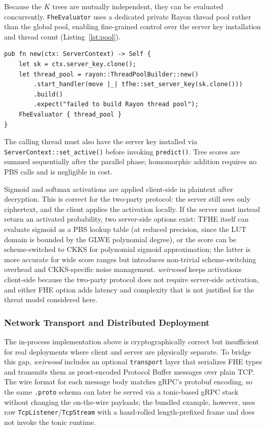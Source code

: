 \documentclass[12pt]{article}
\begin{document}
Because the $K$ trees are mutually independent, they can be evaluated concurrently. \texttt{FheEvaluator} uses a dedicated private Rayon thread pool \cite{rayon} rather than the global pool, enabling fine-grained control over the server key installation and thread count (Listing~\ref{lst:pool}).

\begin{lstlisting}[caption={FheEvaluator construction (\texttt{src/eval/fhe/evaluator.rs}). The \texttt{start\_handler} closure installs the server key into each worker thread's local storage at spawn time.}, label={lst:pool}]
pub fn new(ctx: ServerContext) -> Self {
    let sk = ctx.server_key.clone();
    let thread_pool = rayon::ThreadPoolBuilder::new()
        .start_handler(move |_| tfhe::set_server_key(sk.clone()))
        .build()
        .expect("failed to build Rayon thread pool");
    FheEvaluator { thread_pool }
}
\end{lstlisting}

The calling thread must also have the server key installed via \texttt{ServerContext::set\_active()} before invoking \texttt{predict()}. Tree scores are summed sequentially after the parallel phase; homomorphic addition requires no PBS calls and is negligible in cost.

Sigmoid and softmax activations are applied client-side in plaintext after decryption. This is correct for the two-party protocol: the server still sees only ciphertext, and the client applies the activation locally. If the server must instead return an activated probability, two server-side options exist: TFHE itself can evaluate sigmoid as a PBS lookup table (at reduced precision, since the LUT domain is bounded by the GLWE polynomial degree), or the score can be scheme-switched to CKKS \cite{ckks} for polynomial sigmoid approximation; the latter is more accurate for wide score ranges but introduces non-trivial scheme-switching overhead and CKKS-specific noise management. \textit{weirwood} keeps activations client-side because the two-party protocol does not require server-side activation, and either FHE option adds latency and complexity that is not justified for the threat model considered here.

\subsubsection*{Network Transport and Distributed Deployment}

The in-process implementation above is cryptographically correct but insufficient for real deployments where client and server are physically separate. To bridge this gap, \textit{weirwood} includes an optional \texttt{transport} layer that serializes FHE types and transmits them as prost-encoded Protocol Buffer messages over plain TCP. The wire format for each message body matches gRPC's protobuf encoding, so the same \texttt{.proto} schema can later be served via a tonic-based gRPC stack without changing the on-the-wire payloads; the bundled example, however, uses raw \texttt{TcpListener}/\texttt{TcpStream} with a hand-rolled length-prefixed frame and does not invoke the tonic runtime.
\end{document}
